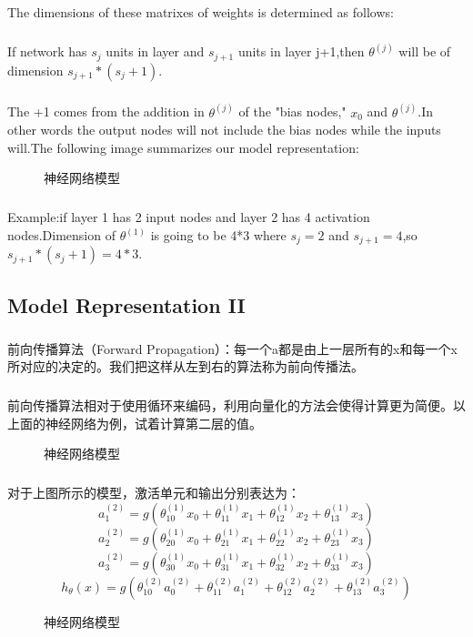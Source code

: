 \documentclass{article}
\begin{document}
\begin{CJK}{UTF8}{gbsn}
The dimensions of these matrixes of weights is determined as follows:
\subparagraph{}
If network has $s_j$ units in layer and $s_{j+1}$ units in layer j+1,then $\theta^{(j)}$ will be of dimension $s_{j+1}*(s_j+1)$.
\subparagraph{}
The +1 comes from the addition in $\theta^{(j)}$ of the "bias nodes," $x_0$ and $\theta^{(j)}$.In other words the output nodes will not include the bias nodes while the inputs will.The following image summarizes our model representation:
\begin{figure}[H]
\caption{神经网络模型}
\label{fig:412}
\end{figure}
\subparagraph{}
Example:if layer 1 has 2 input nodes and layer 2 has 4 activation nodes.Dimension of $\theta^{(1)}$ is going to be 4*3 where $s_j=2$ and $s_{j+1}=4$,so $s_{j+1}*(s_j+1)=4*3$.
\subsection{Model Representation II}
\subparagraph{}
前向传播算法（Forward Propagation）：每一个a都是由上一层所有的x和每一个x所对应的决定的。我们把这样从左到右的算法称为前向传播法。
\subparagraph{}
前向传播算法相对于使用循环来编码，利用向量化的方法会使得计算更为简便。以上面的神经网络为例，试着计算第二层的值。
\begin{figure}[H]
\caption{神经网络模型}
\label{fig:409}
\end{figure}
\subparagraph{}
对于上图所示的模型，激活单元和输出分别表达为：
\begin{equation}
a_1^{(2)}=g(\theta_{10}^{(1)}x_0+\theta_{11}^{(1)}x_1+\theta_{12}^{(1)}x_2+\theta_{13}^{(1)}x_3)
\end{equation}
\begin{equation}
a_2^{(2)}=g(\theta_{20}^{(1)}x_0+\theta_{21}^{(1)}x_1+\theta_{22}^{(1)}x_2+\theta_{23}^{(1)}x_3)
\end{equation}
\begin{equation}
a_3^{(2)}=g(\theta_{30}^{(1)}x_0+\theta_{31}^{(1)}x_1+\theta_{32}^{(1)}x_2+\theta_{33}^{(1)}x_3)
\end{equation}
\begin{equation}
h_\theta(x)=g(\theta_{10}^{(2)}a_0^{(2)}+\theta_{11}^{(2)}a_1^{(2)}+\theta_{12}^{(2)}a_2^{(2)}+\theta_{13}^{(2)}a_3^{(2)})
\end{equation}
\begin{figure}[H]
\caption{神经网络模型}

\end{figure}
\end{CJK}
\end{document}
